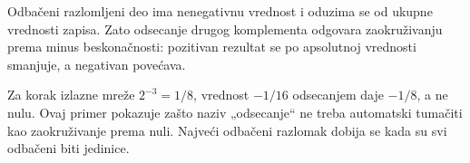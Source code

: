 Odbačeni razlomljeni deo ima nenegativnu vrednost i oduzima se od ukupne vrednosti zapisa. Zato odsecanje drugog komplementa odgovara zaokruživanju prema minus beskonačnosti: pozitivan rezultat se po apsolutnoj vrednosti smanjuje, a negativan povećava.

Za korak izlazne mreže $2^{-3}=1/8$, vrednost $-1/16$ odsecanjem daje $-1/8$, a ne nulu. Ovaj primer pokazuje zašto naziv „odsecanje“ ne treba automatski tumačiti kao zaokruživanje prema nuli. Najveći odbačeni razlomak dobija se kada su svi odbačeni biti jedinice.

